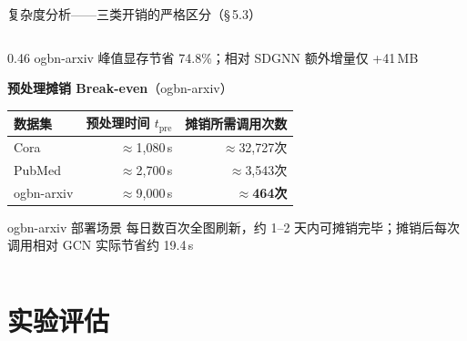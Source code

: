 \documentclass[aspectratio=169,9pt,xcolor=dvipsnames]{beamer}
\newcommand{\highlight}[1]{\textcolor{myred}{\textbf{#1}}}
\newcommand{\blue}[1]{\textcolor{mynavy}{#1}}
\newcommand{\chapternote}{}
\newif\ifshowchapternote
\newcommand{\setchapternote}[1]{%
  \renewcommand{\chapternote}{#1}%
  \showchapternotetrue
}
\begin{document}
\begin{frame}{复杂度分析——三类开销的严格区分（§\,5.3）}
\begin{columns}[T]
\begin{column}{0.46\textwidth}
  \vspace{0.05cm}
  ogbn-arxiv 峰值显存节省 \blue{74.8\%}；相对 SDGNN 额外增量仅 +41\,MB

  \vspace{0.2cm}
  \textbf{\blue{预处理摊销 Break-even}}（ogbn-arxiv）

  \vspace{0.05cm}
  \begin{tabular}{lrr}
    \toprule
    数据集 & 预处理时间 $t_{\mathrm{pre}}$ & 摊销所需调用次数 \\
    \midrule
    Cora       & $\approx$1,080\,s & $\approx$32,727次 \\
    PubMed     & $\approx$2,700\,s & $\approx$3,543次 \\
    ogbn-arxiv & $\approx$9,000\,s & \highlight{$\approx$464次} \\
    \bottomrule
  \end{tabular}

  \vspace{0.1cm}
  \begin{alertblock}{ ogbn-arxiv 部署场景}
       每日数百次全图刷新，约 1--2 天内可摊销完毕；摊销后每次调用相对 GCN 实际节省约 \blue{19.4\,s}
  \end{alertblock}
\end{column}
\end{columns}
\end{frame}

\section{实验评估}
\setchapternote{第6章}
\end{document}
